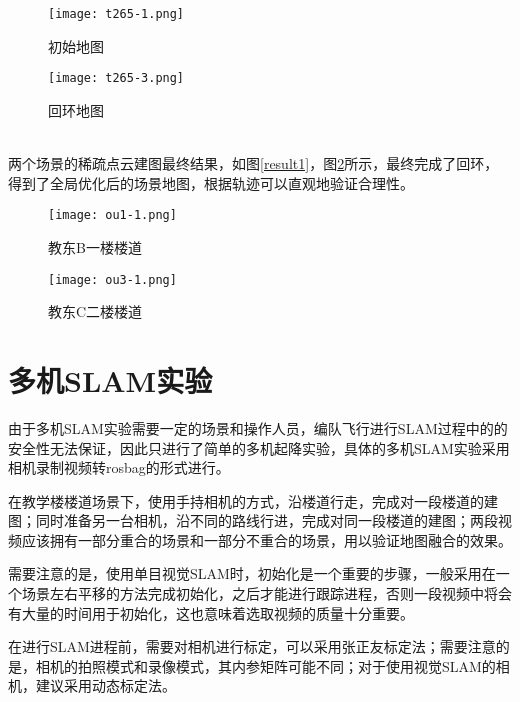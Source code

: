 \begin{figure}[htbp]
	\centering
	\begin{minipage}[t]{0.4\columnwidth} %
		\centering
		\texttt{[image: t265-1.png]}
		\caption{初始地图}
		\label{fig-camera1}
	\end{minipage}
	\begin{minipage}[t]{0.4\columnwidth}
		\centering
		\texttt{[image: t265-3.png]}
		\caption{回环地图}
		\label{fig-camera2}
	\end{minipage}
\end{figure}

~\\
两个场景的稀疏点云建图最终结果，如图\ref{result1}，图\ref{result2}所示，最终完成了回环，得到了全局优化后的场景地图，根据轨迹可以直观地验证合理性。

\begin{figure}[htbp]
	\centering
	\begin{minipage}[t]{0.45\columnwidth} %
		\centering
		\texttt{[image: ou1-1.png]}
		\caption{教东B一楼楼道}
		\label{result1}
	\end{minipage}
	\begin{minipage}[t]{0.45\columnwidth}
		\centering
		\texttt{[image: ou3-1.png]}
		\caption{教东C二楼楼道}
		\label{result2}
	\end{minipage}
\end{figure}


\section{多机SLAM实验}

由于多机SLAM实验需要一定的场景和操作人员，编队飞行进行SLAM过程中的的安全性无法保证，因此只进行了简单的多机起降实验，具体的多机SLAM实验采用相机录制视频转rosbag的形式进行。

在教学楼楼道场景下，使用手持相机的方式，沿楼道行走，完成对一段楼道的建图；同时准备另一台相机，沿不同的路线行进，完成对同一段楼道的建图；两段视频应该拥有一部分重合的场景和一部分不重合的场景，用以验证地图融合的效果。

需要注意的是，使用单目视觉SLAM时，初始化是一个重要的步骤，一般采用在一个场景左右平移的方法完成初始化，之后才能进行跟踪进程，否则一段视频中将会有大量的时间用于初始化，这也意味着选取视频的质量十分重要。

在进行SLAM进程前，需要对相机进行标定，可以采用张正友标定法；需要注意的是，相机的拍照模式和录像模式，其内参矩阵可能不同；对于使用视觉SLAM的相机，建议采用动态标定法。

